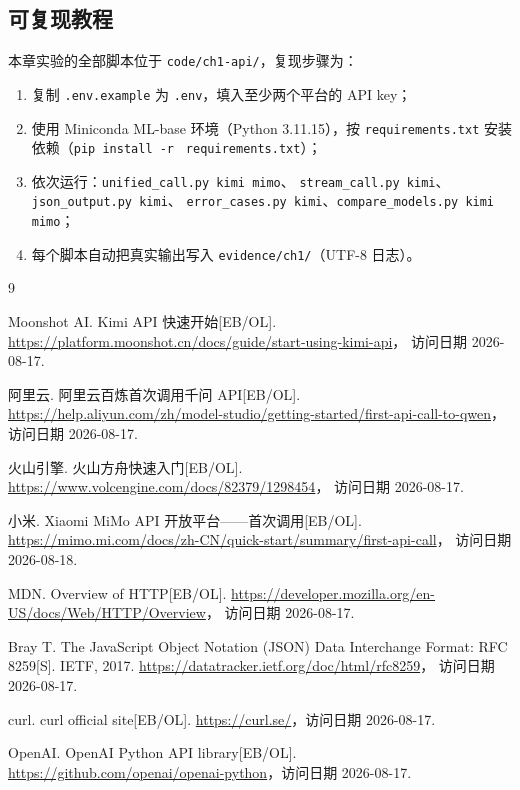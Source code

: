\subsection{可复现教程}

本章实验的全部脚本位于 \texttt{code/ch1-api/}，复现步骤为：

\begin{enumerate}[leftmargin=4em,itemsep=0pt,topsep=2pt]
    \item 复制 \texttt{.env.example} 为 \texttt{.env}，填入至少两个平台的 API key；
    \item 使用 Miniconda ML-base 环境（Python 3.11.15），按
          \texttt{requirements.txt} 安装依赖（\texttt{pip install -r}
          \texttt{ requirements.txt}）；
    \item 依次运行：\texttt{unified\_call.py kimi mimo}、
          \texttt{stream\_call.py kimi}、\texttt{json\_output.py kimi}、
          \texttt{error\_cases.py kimi}、\texttt{compare\_models.py kimi mimo}；
    \item 每个脚本自动把真实输出写入 \texttt{evidence/ch1/}（UTF-8 日志）。
\end{enumerate}

\begin{thebibliography}{9}

Moonshot AI. Kimi API 快速开始[EB/OL].
\url{https://platform.moonshot.cn/docs/guide/start-using-kimi-api}，
访问日期 2026-08-17.

阿里云. 阿里云百炼首次调用千问 API[EB/OL].
\url{https://help.aliyun.com/zh/model-studio/getting-started/first-api-call-to-qwen}，
访问日期 2026-08-17.

火山引擎. 火山方舟快速入门[EB/OL].
\url{https://www.volcengine.com/docs/82379/1298454}，
访问日期 2026-08-17.

小米. Xiaomi MiMo API 开放平台——首次调用[EB/OL].
\url{https://mimo.mi.com/docs/zh-CN/quick-start/summary/first-api-call}，
访问日期 2026-08-18.

MDN. Overview of HTTP[EB/OL].
\url{https://developer.mozilla.org/en-US/docs/Web/HTTP/Overview}，
访问日期 2026-08-17.

Bray T. The JavaScript Object Notation (JSON) Data Interchange Format:
RFC 8259[S]. IETF, 2017.
\url{https://datatracker.ietf.org/doc/html/rfc8259}，
访问日期 2026-08-17.

curl. curl official site[EB/OL].
\url{https://curl.se/}，访问日期 2026-08-17.

OpenAI. OpenAI Python API library[EB/OL].
\url{https://github.com/openai/openai-python}，访问日期 2026-08-17.

\end{thebibliography}
